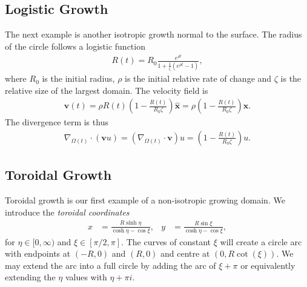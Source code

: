 \documentclass[fleqn,12pt]{siamart1116}
\begin{document}
\subsection{Logistic Growth}

The next example is another isotropic growth normal to the surface. The radius of the circle follows a logistic function
\begin{align}
R(t) = R_0\frac{e^{\rho t}}{1 + \frac{1}{\zeta}(e^{\rho t} - 1)},
\end{align}
where $R_0$ is the initial radius, $\rho$ is the initial relative rate of change and $\zeta$ is the relative size of the largest domain. The velocity field is
\begin{align}
\mathbf{v}(t) = \rho R(t)\left(1 - \frac{R(t)}{R_0 \zeta}\right) \hat{\mathbf{x}} = \rho \left(1 - \frac{R(t)}{R_0 \zeta}\right)\mathbf{x}.
\end{align}
The divergence term is thus
\begin{align}
\nabla_{\Omega(t)} \cdot (\mathbf{v} u) = (\nabla_{\Omega(t)} \cdot \mathbf{v}) u = \left(1 - \frac{R(t)}{R_0 \zeta}\right) u.
\end{align}

\subsection{Toroidal Growth}

Toroidal growth is our first example of a non-isotropic growing domain. We introduce the \emph{toroidal coordinates}
\begin{align}\label{torcoords}
x &= \frac{R \sinh \eta}{\cosh \eta - \cos \xi}, & y &= \frac{R \sin  \xi}{\cosh \eta - \cos \xi},
\end{align}
for $\eta \in [0, \infty)$ and $\xi \in [\pi / 2, \pi]$.
The curves of constant $\xi$ will create a circle arc with endpoints at $(-R, 0)$ and $(R, 0)$ and centre at $(0, R \cot(\xi))$. We may extend the arc into a full circle by adding the arc of $\xi + \pi$ or equivalently extending the $\eta$ values with $\eta + \pi i$.
\end{document}
